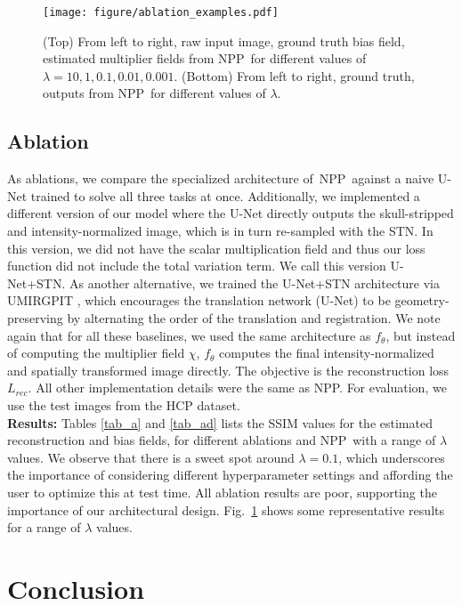 \documentclass[runningheads]{llncs}
\newcommand{\modelname}{NPP}
\begin{document}
\begin{figure}[t]
\centering
\texttt{[image: figure/ablation\_examples.pdf]}
\caption{(Top) From left to right, raw input image, ground truth bias field, estimated multiplier fields from \modelname~for different values of $\lambda={10,1,0.1,0.01,0.001}$. (Bottom) From left to right, ground truth, outputs from \modelname~for different values of $\lambda$.} \label{fig_a}
\end{figure}

\subsection{Ablation}
As ablations, we compare the specialized architecture of~\modelname~against a naive U-Net trained to solve all three tasks at once. 
Additionally, we implemented a different version of our model where the U-Net directly outputs the skull-stripped and intensity-normalized image, which is in turn re-sampled with the STN. In this version, we did not have the scalar multiplication field and thus our loss function did not include the total variation term. 
We call this version U-Net+STN.
As another alternative, we trained the U-Net+STN architecture via UMIRGPIT \cite{arar2020unsupervised}, which encourages the translation network (U-Net) to be geometry-preserving by alternating the order of the translation and registration. 
We note again that for all these baselines, we used the same architecture as $f_\theta$, but instead of computing the multiplier field $\chi$, $f_\theta$ computes the final intensity-normalized and spatially transformed image directly.
The objective is the reconstruction loss $L_{rec}$. 
All other implementation details were the same as \modelname.
For evaluation, we use the test images from the HCP dataset.\\

\noindent
\textbf{Results:}
Tables \ref{tab_a} and \ref{tab_ad} lists the SSIM values for the estimated reconstruction and bias fields, for different ablations and \modelname~with a range of $\lambda$ values.
We observe that there is a sweet spot around $\lambda = 0.1$, which underscores the importance of considering different hyperparameter settings and affording the user to optimize this at test time.
All ablation results are poor, supporting the importance of our architectural design.
Fig.~\ref{fig_a} shows some representative results for a range of $\lambda$ values.

\section{Conclusion}
\end{document}
